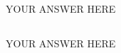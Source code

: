 \documentclass{article}
\begin{document}
\subsection{}
YOUR ANSWER HERE
\subsection{}
YOUR ANSWER HERE
\end{document}
